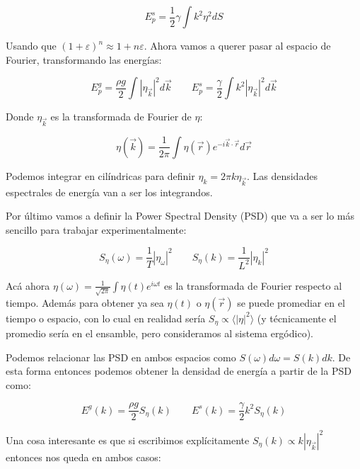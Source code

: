 \begin{equation}
	E_p^s = \frac{1}{2} \gamma\int k^2\eta^2dS
\end{equation}

Usando que $(1+\varepsilon)^n\approx1+n\varepsilon$. Ahora vamos a querer pasar al espacio de Fourier, transformando las energías:

\begin{equation}
	E_p^g = \frac{\rho g}{2} \int |\eta_{\vec k}|^2d\vec k \qquad E_p^s = \frac{\gamma}{2} \int k^2|\eta_{\vec k}|^2d\vec k
\end{equation}

Donde $\eta_{\vec k}$ es la transformada de Fourier de $\eta$:

\begin{equation}
	\eta(\vec k) = \frac{1}{2\pi}\int\eta(\vec r)e^{-i\vec k\cdot\vec r} d\vec r
\end{equation}

Podemos integrar en cilíndricas para definir $\eta_k = 2\pi k\eta_{\vec k}$. Las densidades espectrales de energía van a ser los integrandos. 

Por último vamos a definir la Power Spectral Density (PSD) que va a ser lo más sencillo para trabajar experimentalmente:

\begin{equation}
	S_\eta(\omega) = \frac{1}{T} |\eta_\omega|^2 \qquad S_\eta(k) = \frac{1}{L^2} |\eta_k|^2
\end{equation}

Acá ahora $\eta(\omega) = \frac{1}{\sqrt{2\pi}}\int\eta(t)e^{i\omega t}$ es la transformada de Fourier respecto al tiempo. Además para obtener ya sea $\eta(t)$ o $\eta(\vec r)$ se puede promediar en el tiempo o espacio, con lo cual en realidad sería $S_\eta\propto\langle |\eta|^2 \rangle$ (y técnicamente el promedio sería en el ensamble, pero consideramos al sistema ergódico). \cite{falconExperimentsSurfaceGravity2022}

Podemos relacionar las PSD en ambos espacios como $S(\omega)d\omega=S(k)dk$. De esta forma entonces podemos obtener la densidad de energía a partir de la PSD como:

\begin{equation}
		E^g(k) = \frac{\rho g}{2} S_\eta(k) \qquad E^s(k)=\frac{\gamma}{2}k^2S_\eta(k)
\end{equation}


Una cosa interesante es que si escribimos explícitamente $S_\eta(k) \propto k|\eta_{\vec k}|^2$ entonces nos queda en ambos casos:


